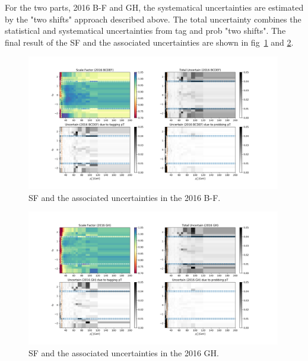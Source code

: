 For the two parts, 2016 B-F and GH, the systematical uncertainties are estimated by the "two shifts" approach described above. 
The total uncertainty combines the statistical and systematical uncertainties from tag and prob "two shifts".
The final result of the SF and the associated uncertainties are shown in fig~\ref{fig:eTrSF_err_BCDEF} and \ref{fig:eTrSF_err_GH}.

\begin{figure}
    \centering
    \includegraphics[width=0.99\textwidth]{chapters/Appendix/sectionEleTrigger/figures/result_BCDEF.png}
    
    \caption{SF and the associated uncertainties in the 2016 B-F.}
    \label{fig:eTrSF_err_BCDEF}
\end{figure}

\begin{figure}
    \centering
    \includegraphics[width=0.99\textwidth]{chapters/Appendix/sectionEleTrigger/figures/result_GH.png}
    
    \caption{SF and the associated uncertainties in the 2016 GH.}
    \label{fig:eTrSF_err_GH}
\end{figure}

\FloatBarrier
